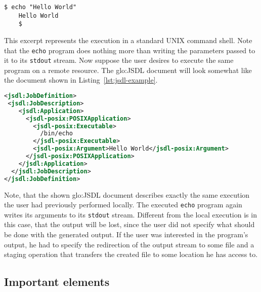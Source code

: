 \begin{minipage}{0.75\textwidth}
  \begin{lstlisting}[language=ksh]
    $ echo "Hello World"
    Hello World
    $
  \end{lstlisting}
\end{minipage}

This  excerpt  represents  the   execution  in  a  standard  UNIX  command
shell. Note that the \texttt{echo}  program does nothing more than writing
the parameters passed to it to its \texttt{stdout} stream. Now suppose the
user  desires  to execute  the  same program  on  a  remote resource.  The
\gls{glo:JSDL}  document will  look somewhat  like the  document  shown in
Listing~\ref{lst:jsdl-example}.

\medskip
\begin{center}
    \begin{lstlisting}[captionpos=b,float=t,backgroundcolor=\color{listingcolor},frame=lines,numbers=none,stepnumber=5,numberfirstline=false,numberstyle=\tiny,caption={A
      small ``Hello World''-example written in
      \gls{glo:JSDL}},label={lst:jsdl-example},language=XML]
<jsdl:JobDefinition>
 <jsdl:JobDescription>
    <jsdl:Application>
      <jsdl-posix:POSIXApplication>
        <jsdl-posix:Executable>
          /bin/echo
        </jsdl-posix:Executable>
        <jsdl-posix:Argument>Hello World</jsdl-posix:Argument>
      </jsdl-posix:POSIXApplication>
    </jsdl:Application>
  </jsdl:JobDescription>
</jsdl:JobDefinition>
     \end{lstlisting}
\end{center}

Note, that  the shown \gls{glo:JSDL}  document describes exactly  the same
execution  the  user  had  previously  performed  locally.   The  executed
\texttt{echo} program  again writes  its arguments to  its \texttt{stdout}
stream.   Different from the  local execution  is in  this case,  that the
output will  be lost, since the user  did not specify what  should be done
with the  generated output.  If the  user was interested  in the program's
output, he  had to specify  the redirection of  the output stream  to some
file  and a  staging operation  that transfers  the created  file  to some
location he has access to.

\subsection{Important elements}


